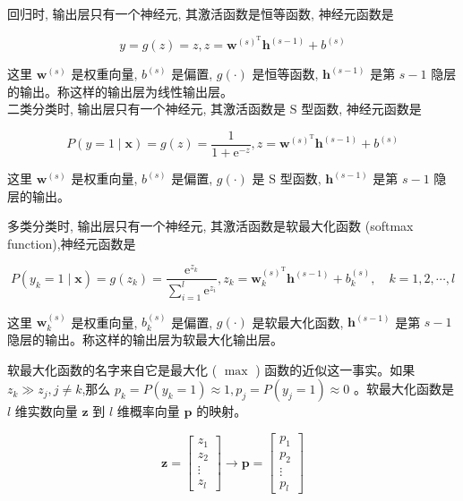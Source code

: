 \documentclass[10pt]{article}
\begin{document}
\begin{CJK*}{UTF8}{bsmi}
回归时, 输出层只有一个神经元, 其激活函数是恒等函数, 神经元函数是


\begin{equation*}
y=g(z)=z, z=\boldsymbol{w}^{(s)^{\mathrm{T}}} \boldsymbol{h}^{(s-1)}+b^{(s)} \tag{23.21}
\end{equation*}


这里 $\boldsymbol{w}^{(s)}$ 是权重向量, $b^{(s)}$ 是偏置, $g(\cdot)$ 是恒等函数, $\boldsymbol{h}^{(s-1)}$ 是第 $s-1$ 隐层的输出。称这样的输出层为线性输出层。\\
二类分类时, 输出层只有一个神经元, 其激活函数是 $\mathrm{S}$ 型函数, 神经元函数是


\begin{equation*}
P(y=1 \mid \boldsymbol{x})=g(z)=\frac{1}{1+\mathrm{e}^{-z}}, z=\boldsymbol{w}^{(s)^{\mathrm{T}}} \boldsymbol{h}^{(s-1)}+b^{(s)} \tag{23.22}
\end{equation*}


这里 $\boldsymbol{w}^{(s)}$ 是权重向量, $b^{(s)}$ 是偏置, $g(\cdot)$ 是 $\mathrm{S}$ 型函数, $\boldsymbol{h}^{(s-1)}$ 是第 $s-1$ 隐层的输出。

多类分类时, 输出层只有一个神经元, 其激活函数是软最大化函数 (softmax function),神经元函数是


\begin{equation*}
P\left(y_{k}=1 \mid \boldsymbol{x}\right)=g\left(z_{k}\right)=\frac{\mathrm{e}^{z_{k}}}{\sum_{i=1}^{l} \mathrm{e}^{z_{i}}}, z_{k}=\boldsymbol{w}_{k}^{(s)^{\mathrm{T}}} \boldsymbol{h}^{(s-1)}+b_{k}^{(s)}, \quad k=1,2, \cdots, l \tag{23.23}
\end{equation*}


这里 $\boldsymbol{w}_{k}^{(s)}$ 是权重向量, $b_{k}^{(s)}$ 是偏置, $g(\cdot)$ 是软最大化函数, $\boldsymbol{h}^{(s-1)}$ 是第 $s-1$ 隐层的输出。称这样的输出层为软最大化输出层。

软最大化函数的名字来自它是最大化 ( $\max$ ) 函数的近似这一事实。如果 $z_{k} \gg z_{j}, j \neq k$,那么 $p_{k}=P\left(y_{k}=1\right) \approx 1, p_{j}=P\left(y_{j}=1\right) \approx 0$ 。软最大化函数是 $l$ 维实数向量 $\boldsymbol{z}$ 到 $l$ 维概率向量 $\boldsymbol{p}$ 的映射。

$$
\boldsymbol{z}=\left[\begin{array}{c}
z_{1} \\
z_{2} \\
\vdots \\
z_{l}
\end{array}\right] \rightarrow \boldsymbol{p}=\left[\begin{array}{c}
p_{1} \\
p_{2} \\
\vdots \\
p_{l}
\end{array}\right]
$$


\end{CJK*}
\end{document}
